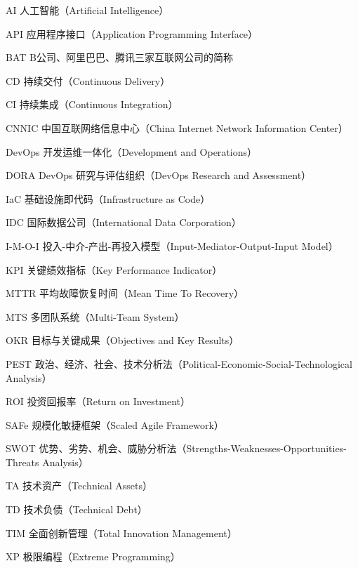 
\begin{denotation}[3cm]
  \item[AI] 人工智能（Artificial Intelligence）
  \item[API] 应用程序接口（Application Programming Interface）
  \item[BAT] B公司、阿里巴巴、腾讯三家互联网公司的简称
  \item[CD] 持续交付（Continuous Delivery）
  \item[CI] 持续集成（Continuous Integration）
  \item[CNNIC] 中国互联网络信息中心（China Internet Network Information Center）
  \item[DevOps] 开发运维一体化（Development and Operations）
  \item[DORA] DevOps 研究与评估组织（DevOps Research and Assessment）
  \item[IaC] 基础设施即代码（Infrastructure as Code）
  \item[IDC] 国际数据公司（International Data Corporation）
  \item[I-M-O-I] 投入-中介-产出-再投入模型（Input-Mediator-Output-Input Model）
  \item[KPI] 关键绩效指标（Key Performance Indicator）
  \item[MTTR] 平均故障恢复时间（Mean Time To Recovery）
  \item[MTS] 多团队系统（Multi-Team System）
  \item[OKR] 目标与关键成果（Objectives and Key Results）
  \item[PEST] 政治、经济、社会、技术分析法（Political-Economic-Social-Technological Analysis）
  \item[ROI] 投资回报率（Return on Investment）
  \item[SAFe] 规模化敏捷框架（Scaled Agile Framework）
  \item[SWOT] 优势、劣势、机会、威胁分析法（Strengths-Weaknesses-Opportunities-Threats Analysis）
  \item[TA] 技术资产（Technical Assets）
  \item[TD] 技术负债（Technical Debt）
  \item[TIM] 全面创新管理（Total Innovation Management）
  \item[XP] 极限编程（Extreme Programming）
\end{denotation}




